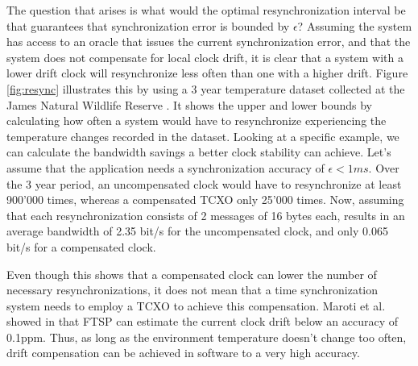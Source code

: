 The question that arises is what would the optimal resynchronization interval be
that guarantees that synchronization error is bounded by
$\epsilon$? Assuming the system has access to an oracle that issues
the current synchronization error, and that the system does not compensate for
local clock drift, it is clear that a system with a lower drift clock will
resynchronize less often than one with a higher drift. Figure \ref{fig:resync}
illustrates this by using a 3 year temperature dataset collected at the James
Natural Wildlife Reserve \cite{mosscam}. It shows the upper and lower bounds
by calculating how often a system would have to resynchronize experiencing the
temperature changes recorded in the dataset. Looking at a specific example,
we can calculate the bandwidth savings a better clock stability can achieve.
Let's assume that the application needs a synchronization accuracy of
$\epsilon<1ms$. Over the 3 year period, an uncompensated clock would have to
resynchronize at least 900'000 times, whereas a compensated
TCXO only 25'000 times. Now, assuming that each resynchronization consists of
2 messages of 16 bytes each, results in an average bandwidth of 2.35 bit/s for
the uncompensated clock, and only 0.065 bit/s for a compensated clock.

Even though this shows that a compensated clock can lower the number of
necessary resynchronizations, it does not mean that a time synchronization
system needs to employ a TCXO to achieve this compensation. Maroti et al.
showed in \cite{maroti2004ftsp} that FTSP can estimate the current clock drift
below an accuracy of 0.1ppm. Thus, as long as the environment temperature
doesn't change too often, drift compensation can be achieved in software to a
very high accuracy.

